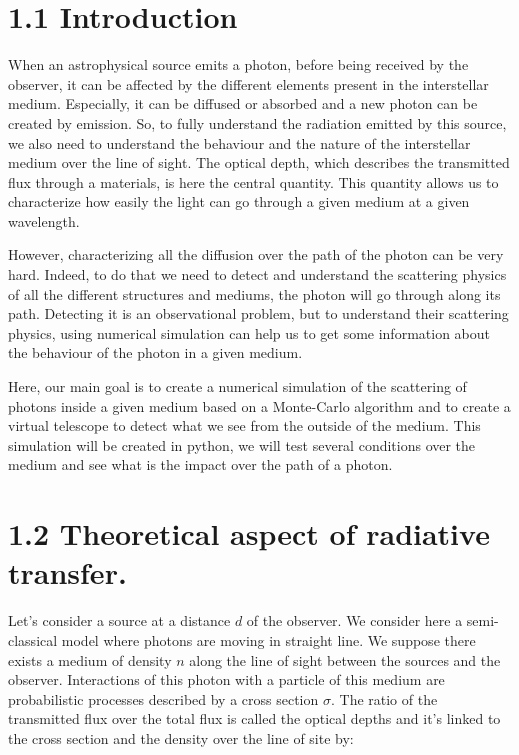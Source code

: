 \documentclass[10pt,a4paper,oneside]{article}
\begin{document}
\begin{multicols}{2}

\section*{1.1 Introduction}
\quad When an astrophysical source emits a photon, before being received by the observer, it can be affected by the different elements present in the interstellar medium. Especially, it can be diffused or absorbed and a new photon can be created by emission. So, to fully understand the radiation emitted by this source, we also need to understand the behaviour and the nature of the interstellar medium over the line of sight. The optical depth, which describes the transmitted flux through a materials, is here the central quantity. This quantity allows us to characterize how easily the light can go through a given medium at a given wavelength.

However, characterizing all the diffusion over the path of the photon can be very hard. Indeed, to do that we need to detect and understand the scattering physics of all the different structures and mediums, the photon will go through along its path. Detecting it is an observational problem, but to understand their scattering physics, using numerical simulation can help us to get some information about the behaviour of the photon in a given medium. 


Here, our main goal is to create a numerical simulation of the scattering of photons inside a given medium based on a Monte-Carlo algorithm and to create a virtual telescope to detect what we see from the outside of the medium. This simulation will be created in python, we will test several conditions over the medium and see what is the impact over the path of a photon.

\section*{1.2 Theoretical aspect of radiative transfer. }





\quad Let's consider a source at a distance $d$ of the observer. We consider here a semi-classical model where photons are moving in straight line. We suppose there exists a medium of density $n$ along the line of sight between the sources and the observer. Interactions of this photon with a particle of this medium are probabilistic processes described by a cross section $\sigma$. The ratio of the transmitted flux over the total flux is called the optical depths and it's linked to the cross section and the density over the line of site by: 


\end{multicols}
\end{document}
